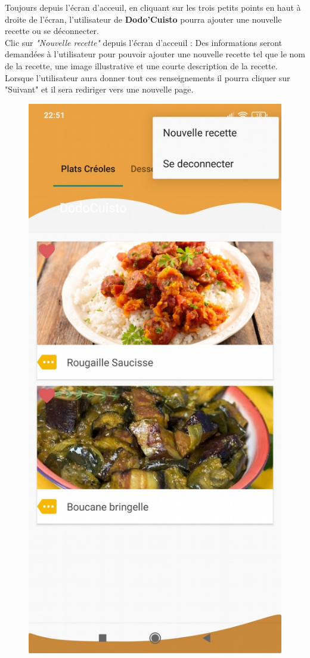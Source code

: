 \documentclass{article}
\begin{document}
Toujours depuis l’écran d’acceuil, en cliquant sur les trois petits points en haut à droite de l’écran, l’utilisateur de \textbf{Dodo’Cuisto} pourra ajouter une nouvelle recette ou se déconnecter.\\

Clic sur \textit{"Nouvelle recette"} depuis l’écran d’acceuil : Des informations seront demandées à l’utilisateur pour pouvoir ajouter une nouvelle recette tel que le nom de la recette, une image illustrative et une courte description de la recette. Lorsque l’utilisateur aura donner tout ces renseignements il pourra cliquer sur "Suivant" et il sera rediriger vers une nouvelle page.

\begin{figure}
    \center
    \includegraphics[scale=0.152]{latexImage_eb004d55af912ff8e84e9b6d41a55581.png}
\end{figure}
\end{document}
